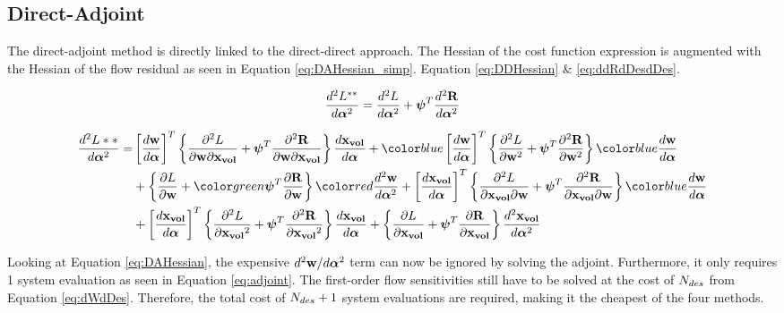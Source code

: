 \documentclass[letterpaper,12pt,]{article}
\begin{document}
\newpage
\subsection*{Direct-Adjoint}

The direct-adjoint method is directly linked to the direct-direct approach.
The Hessian of the cost function expression is augmented with the Hessian of the flow residual as seen in Equation \ref{eq:DAHessian_simp}.
Equation \ref{eq:DDHessian} \& \ref{eq:ddRdDesdDes}.

\begin{equation}
\begin{split}
	\dfrac{d^2L^{**}}{d\boldsymbol{\alpha}^2} 
	=
	\dfrac{d^2L}{d\boldsymbol{\alpha}^2} 
	+
	\boldsymbol{\psi}^T
	\dfrac{d^2\mathbf{R}}{d\boldsymbol{\alpha}^2} 
\label{eq:DAHessian_simp}
\end{split}
\end{equation}

\begin{equation}
\begin{split}
	\DDt{L**}{\balfa} 
	=&
	\trans{\Dt{\bw}{\balfa}}
	\left\{
		\ddelm{L}{\bw}{\xvol}
		+
		\bpsi^T
		\ddelm{\bR}{\bw}{\xvol}
	\right\}
	\Dt{\xvol}{\balfa}
	+
	\blue{\trans{\Dt{\bw}{\balfa}}}
	\left\{
		\ddel{L}{\bw}
		+
		\bpsi^T
		\ddel{\bR}{\bw}
	\right\}
	\blue{\Dt{\bw}{\balfa}}
	\\&+
	\left\{
		\del{L}{\bw}
		+
		\green{\bpsi^T}
		\del{\bR}{\bw}
	\right\}
	\red{\DDt{\bw}{\balfa}}
	+
	\trans{\Dt{\xvol}{\balfa}}
	\left\{
		\ddelm{L}{\xvol}{\bw}
		+
		\bpsi^T
		\ddelm{\bR}{\xvol}{\bw}
	\right\}
	\blue{\Dt{\bw}{\balfa}}
	\\&+
	\trans{\Dt{\xvol}{\balfa}}
	\left\{
		\ddel{L}{\xvol}
		+
		\bpsi^T
		\ddel{\bR}{\xvol}
	\right\}
	\Dt{\xvol}{\balfa}
	+
	\left\{
		\del{L}{\xvol}
		+
		\bpsi^T
		\del{\bR}{\xvol}
	\right\}
	\DDt{\xvol}{\balfa}
\label{eq:DAHessian}
\end{split}
\end{equation}

Looking at Equation \ref{eq:DAHessian}, the expensive $d^2\mathbf{w}/d\boldsymbol{\alpha}^2$ term can now be ignored by solving the adjoint.
Furthermore, it only requires 1 system evaluation as seen in Equation \ref{eq:adjoint}.
The first-order flow sensitivities still have to be solved at the cost of $N_{des}$ from Equation \ref{eq:dWdDes}.
Therefore, the total cost of $N_{des} + 1$ system evaluations are required, making it the cheapest of the four methods.
\end{document}
